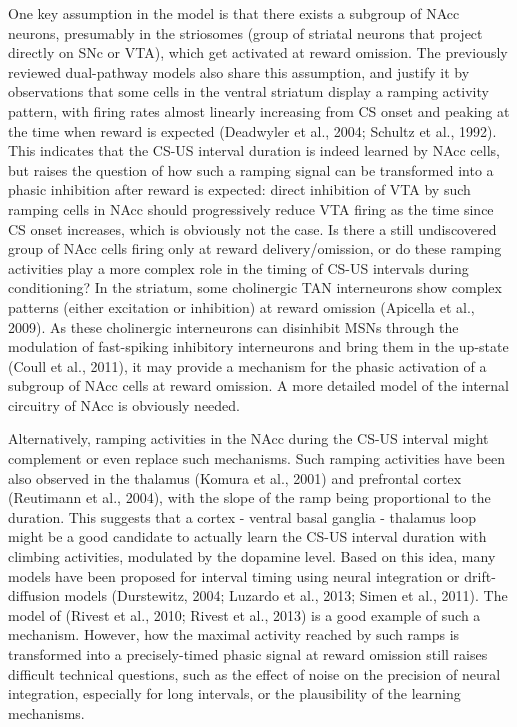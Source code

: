 \documentclass[
  11pt,
  a4paper,
]{scrbook}
\begin{document}
One key assumption in the model is that there exists a subgroup of NAcc
neurons, presumably in the striosomes (group of striatal neurons that
project directly on SNc or VTA), which get activated at reward omission.
The previously reviewed dual-pathway models also share this assumption,
and justify it by observations that some cells in the ventral striatum
display a ramping activity pattern, with firing rates almost linearly
increasing from CS onset and peaking at the time when reward is expected
(Deadwyler et al., 2004; Schultz et al., 1992). This indicates that the
CS-US interval duration is indeed learned by NAcc cells, but raises the
question of how such a ramping signal can be transformed into a phasic
inhibition after reward is expected: direct inhibition of VTA by such
ramping cells in NAcc should progressively reduce VTA firing as the time
since CS onset increases, which is obviously not the case. Is there a
still undiscovered group of NAcc cells firing only at reward
delivery/omission, or do these ramping activities play a more complex
role in the timing of CS-US intervals during conditioning? In the
striatum, some cholinergic TAN interneurons show complex patterns
(either excitation or inhibition) at reward omission (Apicella et al.,
2009). As these cholinergic interneurons can disinhibit MSNs through the
modulation of fast-spiking inhibitory interneurons and bring them in the
up-state (Coull et al., 2011), it may provide a mechanism for the phasic
activation of a subgroup of NAcc cells at reward omission. A more
detailed model of the internal circuitry of NAcc is obviously needed.

Alternatively, ramping activities in the NAcc during the CS-US interval
might complement or even replace such mechanisms. Such ramping
activities have been also observed in the thalamus (Komura et al., 2001)
and prefrontal cortex (Reutimann et al., 2004), with the slope of the
ramp being proportional to the duration. This suggests that a cortex -
ventral basal ganglia - thalamus loop might be a good candidate to
actually learn the CS-US interval duration with climbing activities,
modulated by the dopamine level. Based on this idea, many models have
been proposed for interval timing using neural integration or
drift-diffusion models (Durstewitz, 2004; Luzardo et al., 2013; Simen et
al., 2011). The model of (Rivest et al., 2010; Rivest et al., 2013) is a
good example of such a mechanism. However, how the maximal activity
reached by such ramps is transformed into a precisely-timed phasic
signal at reward omission still raises difficult technical questions,
such as the effect of noise on the precision of neural integration,
especially for long intervals, or the plausibility of the learning
mechanisms.
\end{document}
